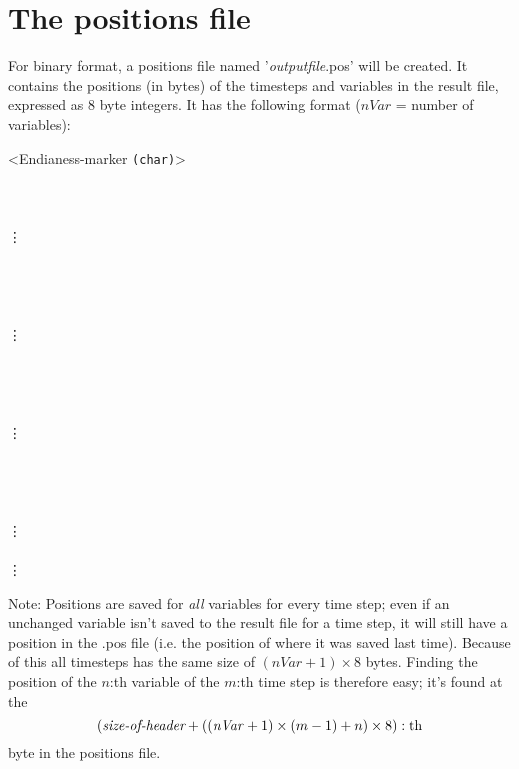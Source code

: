\section{The positions file}

For binary format, a positions file named '\textit{outputfile}.pos' will be
created.  It contains the positions (in bytes) of the timesteps and
variables in the result file, expressed as 8 byte integers.  It has the
following format ($\mathit{nVar}$ = number of variables):

\vspace{2ex}

\noindent<Endianess-marker {\tt\small(char)}>\\
\\
\\
\\
\vdots\\
\\
\\
\\
\\
\vdots\\
\\
\\
\\
\\
\vdots\\
\\
\\
\\
\\
\vdots\\
\\
\vdots

Note: Positions are saved for \emph{all} variables for every time step;
even if an unchanged variable isn't saved to the result file for a time
step, it will still have a position in the .pos file (i.e. the position of
where it was saved last time).  Because of this all timesteps has the same
size of $(\mathit{nVar} + 1)\times 8$ bytes.  Finding the position of the
$n$:th variable of the $m$:th time step is therefore easy; it's found at
the 
\[
    (\text{\it size-of-header}+((\mathit{nVar} + 1)\times (m-1) + n)\times
    8):\text{th}
\]
byte in the positions file.
